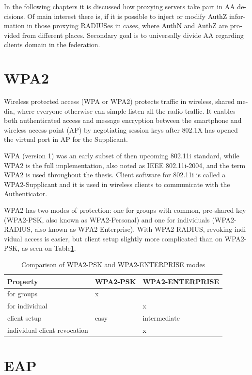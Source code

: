 \documentclass[12pt,a4paper,english]{tutthesis}
\begin{document}
\begin{otherlanguage}{english}
In the following chapters it is discussed how proxying servers take 
part in AA decisions. Of main interest there is, if it is possible 
to inject or modify AuthZ information in those proxying RADIUSes in
cases, where AuthN and AuthZ are provided from different
 places\cite{rfc2607}. Secondary goal is to universally divide AA regarding 
clients domain in the federation.




\section{WPA2}
\label{sec-2-3}

Wireless protected access (WPA or WPA2) protects traffic in wireless,
shared media, where everyone otherwise can simple listen all the radio traffic.
It enables both authenticated access and message
encryption between the smartphone and wireless access point (AP) by negotiating session keys
after 802.1X has opened the virtual port in AP for the Supplicant.

WPA (version 1)  was an early subset of then upcoming 802.11i standard,
while WPA2 is the full implementation, also noted as IEEE
802.11i-2004, and the term WPA2 is used throughout the thesis.
Client software for 802.11i is called a WPA2-Supplicant and it is used
in wireless clients to communicate with the Authenticator. 

WPA2 has two modes of protection: one for groups with common, pre-shared
key (WPA2-PSK, also known as WPA2-Personal) and one for individuals
(WPA2-RADIUS, also known as  WPA2-Enterprise).  With WPA2-RADIUS, revoking
individual access is easier, but client setup slightly more
complicated than on WPA2-PSK, as seen on Table\ref{psk-enterprise}.

\begin{table}[htb]
\caption{\label{psk-enterprise}Comparison of WPA2-PSK and WPA2-ENTERPRISE modes}
\centering
\begin{tabular}{l|l|l}
Property & WPA2-PSK & WPA2-ENTERPRISE\\
\hline
for groups & x & \\
for individual &  & x\\
client setup & easy & intermediate\\
individual client revocation &  & x\\
\hline
\end{tabular}
\end{table}


\section{EAP}
\label{sec-2-4}


\end{otherlanguage}
\end{document}
